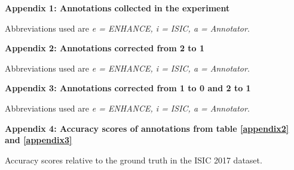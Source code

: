 \documentclass[../report.tex]{subfiles}
\begin{document}
\textbf{Appendix 1: Annotations collected in the experiment} \\

\begin{table}[h!]
\centering
{}
\caption{Abbreviations used are \textit{e = ENHANCE, i = ISIC, a = Annotator}.}
\end{table}

\pagebreak

\textbf{Appendix 2: Annotations corrected from 2 to 1} \\

\begin{table}[h!]
\centering
{}
\caption{Abbreviations used are \textit{e = ENHANCE, i = ISIC, a = Annotator}.}
\label{appendix2}
\end{table}

\pagebreak

\textbf{Appendix 3: Annotations corrected from 1 to 0 and 2 to 1} \\

\begin{table}[h!]
\centering
{}
\caption{Abbreviations used are \textit{e = ENHANCE, i = ISIC, a = Annotator}.}
\label{appendix3}
\end{table}

\pagebreak

\textbf{Appendix 4: Accuracy scores of annotations from table \ref{appendix2} and \ref{appendix3}} \\

\begin{table}[h!]
\centering
{}
\caption{Accuracy scores relative to the ground truth in the ISIC 2017 dataset.}
\end{table}
\end{document}
